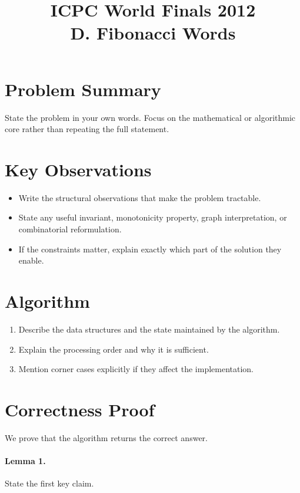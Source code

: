 \documentclass[11pt]{article}
\title{ICPC World Finals 2012\\D. Fibonacci Words}
\author{}
\date{}
\begin{document}
\maketitle

\section*{Problem Summary}

State the problem in your own words. Focus on the mathematical or algorithmic core rather than repeating the full statement.

\section*{Key Observations}

\begin{itemize}[leftmargin=*]
    \item Write the structural observations that make the problem tractable.
    \item State any useful invariant, monotonicity property, graph interpretation, or combinatorial reformulation.
    \item If the constraints matter, explain exactly which part of the solution they enable.
\end{itemize}

\section*{Algorithm}

\begin{enumerate}[leftmargin=*]
    \item Describe the data structures and the state maintained by the algorithm.
    \item Explain the processing order and why it is sufficient.
    \item Mention corner cases explicitly if they affect the implementation.
\end{enumerate}

\section*{Correctness Proof}

We prove that the algorithm returns the correct answer.

\paragraph{Lemma 1.}
State the first key claim.
\end{document}
